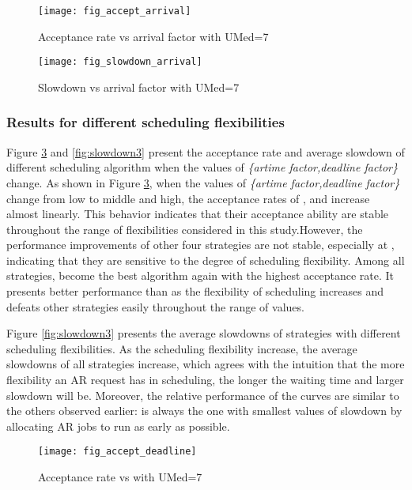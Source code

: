 \documentclass[preprint,12pt]{elsarticle}
\begin{document}
\begin{figure}[htp]
\centering
\texttt{[image: fig\_accept\_arrival]}
\caption{Acceptance rate vs arrival factor with UMed=7}
\label{fig:accept2}
\end{figure}


\begin{figure}[htp]
\centering
\texttt{[image: fig\_slowdown\_arrival]}
\caption{Slowdown vs arrival factor with UMed=7}
\label{fig:slowdown2}
\end{figure}


\subsubsection{Results for different scheduling flexibilities}

Figure \ref{fig:accept3} and \ref{fig:slowdown3} present the acceptance rate and  average slowdown of different scheduling algorithm when the values of \emph{\{artime factor,deadline factor\}} change.
As shown in Figure \ref{fig:accept3}, when the values of \emph{\{artime factor,deadline factor\}} change from low to middle and high, the acceptance rates of ,  and  increase almost linearly. This behavior indicates that their acceptance ability are stable throughout the range of flexibilities considered in this study.However, the performance improvements of other four strategies are not stable, especially at , indicating that they are sensitive to the degree of scheduling flexibility.  Among all strategies,  become the best algorithm again with the highest acceptance rate. It presents better performance than  as the flexibility of scheduling increases and defeats other strategies easily throughout the range of values.

Figure \ref{fig:slowdown3} presents the average slowdowns of strategies with different scheduling flexibilities. As the scheduling flexibility increase, the average slowdowns of all strategies increase, which agrees with the intuition that the more flexibility an AR request has in scheduling, the longer the waiting time and larger slowdown will be.  Moreover, the relative performance of the curves are similar to the others observed earlier:  is always the one with smallest values of slowdown by allocating AR jobs to run as early as possible.


\begin{figure}[htp]
\centering
\texttt{[image: fig\_accept\_deadline]}
\caption{Acceptance rate vs  with UMed=7}
\label{fig:accept3}
\end{figure}
\end{document}
